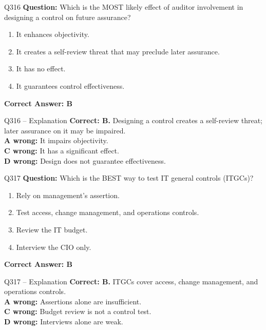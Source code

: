 \documentclass[aspectratio=169,10pt]{beamer}
\begin{document}
	\begin{frame}[t]{Q316}
		\small
		\textbf{Question:} Which is the MOST likely effect of auditor involvement in designing a control on future assurance?
		\begin{enumerate}[label=\Alph*.,itemsep=1pt,topsep=2pt]
			\item It enhances objectivity.
			\item It creates a self-review threat that may preclude later assurance.
			\item It has no effect.
			\item It guarantees control effectiveness.
		\end{enumerate}
		\vspace{4pt}
		\textbf{Correct Answer: B}
	\end{frame}
	
	\begin{frame}[t]{Q316 -- Explanation}
		\small
		\textbf{Correct: B.} Designing a control creates a self-review threat; later assurance on it may be impaired. \\[4pt]
		\textbf{A wrong:} It impairs objectivity. \\[2pt]
		\textbf{C wrong:} It has a significant effect. \\[2pt]
		\textbf{D wrong:} Design does not guarantee effectiveness.
	\end{frame}
	
	\begin{frame}[t]{Q317}
		\small
		\textbf{Question:} Which is the BEST way to test IT general controls (ITGCs)?
		\begin{enumerate}[label=\Alph*.,itemsep=1pt,topsep=2pt]
			\item Rely on management's assertion.
			\item Test access, change management, and operations controls.
			\item Review the IT budget.
			\item Interview the CIO only.
		\end{enumerate}
		\vspace{4pt}
		\textbf{Correct Answer: B}
	\end{frame}
	
	\begin{frame}[t]{Q317 -- Explanation}
		\small
		\textbf{Correct: B.} ITGCs cover access, change management, and operations controls. \\[4pt]
		\textbf{A wrong:} Assertions alone are insufficient. \\[2pt]
		\textbf{C wrong:} Budget review is not a control test. \\[2pt]
		\textbf{D wrong:} Interviews alone are weak.
	\end{frame}
	
\end{document}
